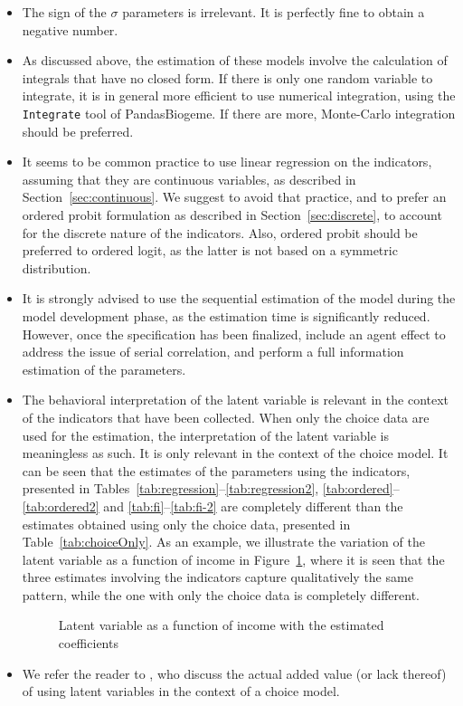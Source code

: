 \documentclass[12pt,a4paper]{article}
\newcommand{\PDBIOGEME}{PandasBiogeme}
\begin{document}
\begin{itemize}
\item The sign of the $\sigma$ parameters is irrelevant. It is
  perfectly fine to obtain a negative number. 
\item As discussed above, the estimation of these models involve the
  calculation of integrals that have no closed form. If there is only
  one random variable to integrate, it is in general more efficient to
  use numerical integration, using the \lstinline$Integrate$ tool of
  \PDBIOGEME. If there are more, Monte-Carlo integration should be
  preferred. 
\item It seems to be common practice to use linear regression on the
  indicators, assuming that they are continuous variables, as
  described in Section~\ref{sec:continuous}. We suggest
  to avoid that practice, and to prefer an ordered probit formulation as
  described in Section~\ref{sec:discrete}, to account for the discrete nature of
  the indicators. Also, ordered probit should be preferred to ordered
  logit, as the latter is not based on a symmetric
  distribution. 
\item It is strongly advised to use the sequential estimation of the
  model during the model development phase, as the estimation time is
  significantly reduced. However, once
  the specification has been finalized, include an agent effect to
  address the issue of serial correlation, and perform a full information estimation
  of the parameters.
\item The behavioral interpretation of the latent variable is relevant
  in the context of the indicators that have been collected. When only
  the choice data are used for the estimation, the interpretation of
  the latent variable  is meaningless as such. It is only
  relevant in the context of the choice model. It can be seen that the
  estimates of the parameters using the indicators, presented in
  Tables~\ref{tab:regression}--\ref{tab:regression2},
  \ref{tab:ordered}--\ref{tab:ordered2} and \ref{tab:fi}--\ref{tab:fi-2} are completely
  different than the estimates obtained using only the choice data,
  presented in Table~\ref{tab:choiceOnly}. As an example, we
  illustrate the variation of the latent variable as a function of
  income in Figure~\ref{fig:piecewiseIncome}, where it is seen that
  the three estimates involving the indicators capture qualitatively
  the same pattern, while the one with only the choice data is
  completely different. 

\begin{figure}[htb]

\caption{\label{fig:piecewiseIncome}Latent variable as a function of
  income with the estimated coefficients}
\end{figure}

\item We refer the reader to , who discuss the actual
  added value (or lack thereof) of using latent variables in the
  context of a choice   model. 

\end{itemize}
\end{document}
